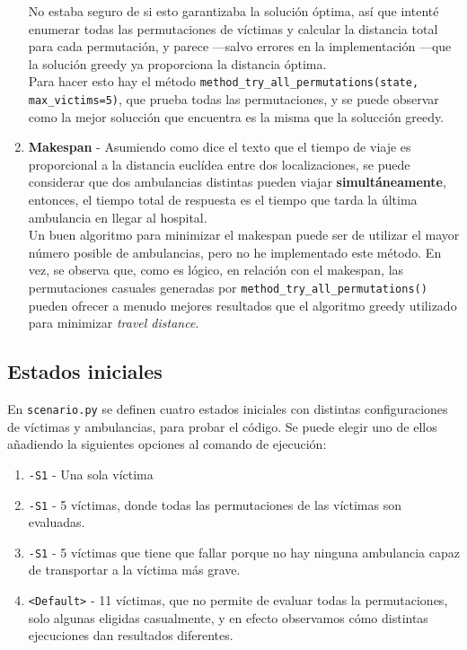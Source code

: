 \begin{enumerate}
   No estaba seguro de si esto garantizaba la solución óptima, así que intenté enumerar todas las permutaciones de víctimas y calcular la distancia total para cada permutación, y parece ---salvo errores en la implementación ---que la solución greedy ya proporciona la distancia óptima.\\
   Para hacer esto hay el método \lstinline|method_try_all_permutations(state, max_victims=5)|, que prueba todas las permutaciones, y se puede observar como la mejor solucción que encuentra es la misma que la solucción greedy.
   \item \textbf{Makespan} - Asumiendo como dice el texto que el tiempo de viaje es proporcional a la distancia euclídea entre dos localizaciones, se puede considerar que dos ambulancias distintas pueden viajar \textbf{simultáneamente}, entonces, el tiempo total de respuesta es el tiempo que tarda la última ambulancia en llegar al hospital.\\
   Un buen algoritmo para minimizar el makespan puede ser de utilizar el mayor número posible de ambulancias, pero no he implementado este método. En vez, se observa que, como es lógico, en relación con el makespan, las permutaciones casuales generadas por \lstinline|method_try_all_permutations()| pueden ofrecer a menudo mejores resultados que el algoritmo greedy utilizado para minimizar \textit{travel distance}.
\end{enumerate}

\subsection{Estados iniciales}

En \texttt{scenario.py} se definen cuatro estados iniciales con distintas configuraciones de víctimas y ambulancias, para probar el código. Se puede elegir uno de ellos añadiendo la siguientes opciones al comando de ejecución:
\begin{enumerate}
   \item \texttt{-S1} - Una sola víctima
   \item \texttt{-S1} - 5 víctimas, donde todas las permutaciones de las víctimas son evaluadas.
   \item \texttt{-S1} - 5 víctimas que tiene que fallar porque no hay ninguna ambulancia capaz de transportar a la víctima más grave.
   \item \texttt{<Default>} - 11 víctimas, que no permite de evaluar todas la permutaciones, solo algunas eligidas casualmente, y en efecto observamos cómo distintas ejecuciones dan resultados diferentes.
\end{enumerate}



